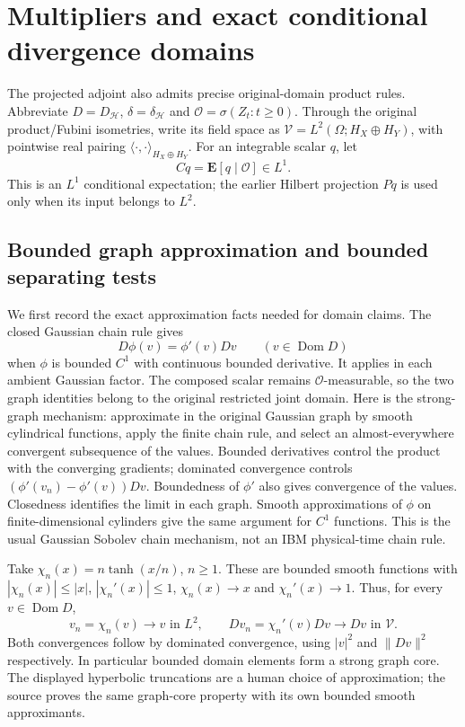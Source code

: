 \documentclass[11pt]{article}
\newcommand{\E}{\mathbf E}\newcommand{\R}{\mathbb R}
\newcommand{\Hh}{\mathcal H}\newcommand{\Dom}{\operatorname{Dom}}
\begin{document}
\section{Multipliers and exact conditional divergence domains}
The projected adjoint also admits precise original-domain product rules.
Abbreviate $D=D_{\Hh}$, $\delta=\delta_{\Hh}$ and
$\mathcal O=\sigma(Z_t:t\geq0)$. Through the original product/Fubini
isometries, write its field space as
$\mathcal V=L^2(\Omega;H_X\oplus H_Y)$, with pointwise real pairing
$\langle\cdot,\cdot\rangle_{H_X\oplus H_Y}$.
For an integrable scalar $q$, let
\[
 Cq=\E[q\mid\mathcal O]\in L^1.
\]
This is an $L^1$ conditional expectation; the earlier Hilbert projection
$Pq$ is used only when its input belongs to $L^2$.

\subsection*{Bounded graph approximation and bounded separating tests}
We first record the exact approximation facts needed for domain claims.
The closed Gaussian chain rule gives
\[
 D\phi(v)=\phi'(v)Dv\qquad(v\in\Dom D)
\]
when $\phi$ is bounded $C^1$ with continuous bounded derivative.
It applies in each ambient Gaussian factor. The composed scalar remains
$\mathcal O$-measurable, so the two graph identities belong to the
original restricted joint domain. Here is the strong-graph mechanism:
approximate in the original Gaussian graph by smooth cylindrical
functions, apply the finite chain rule, and select an almost-everywhere
convergent subsequence of the values. Bounded derivatives control the
product with the converging gradients; dominated convergence controls
$(\phi'(v_n)-\phi'(v))Dv$. Boundedness of $\phi'$ also gives convergence
of the values. Closedness identifies the limit in each graph. Smooth
approximations of $\phi$ on finite-dimensional cylinders give the same
argument for $C^1$ functions. This is the usual Gaussian Sobolev chain
mechanism, not an IBM physical-time chain rule.

Take $\chi_n(x)=n\tanh(x/n)$, $n\geq1$. These are bounded smooth
functions with $|\chi_n(x)|\leq|x|$, $|\chi_n'(x)|\leq1$,
$\chi_n(x)\to x$ and $\chi_n'(x)\to1$. Thus, for every $v\in\Dom D$,
\begin{equation}\label{eq:nativeboundedgraph}
 v_n=\chi_n(v)\longrightarrow v\text{ in }L^2,\qquad
 Dv_n=\chi_n'(v)Dv\longrightarrow Dv\text{ in }\mathcal V.
\end{equation}
Both convergences follow by dominated convergence, using $|v|^2$ and
$\|Dv\|^2$ respectively. In particular bounded domain elements form a
strong graph core. The displayed hyperbolic truncations are a human
choice of approximation; the source proves the same graph-core property
with its own bounded smooth approximants.
\end{document}

